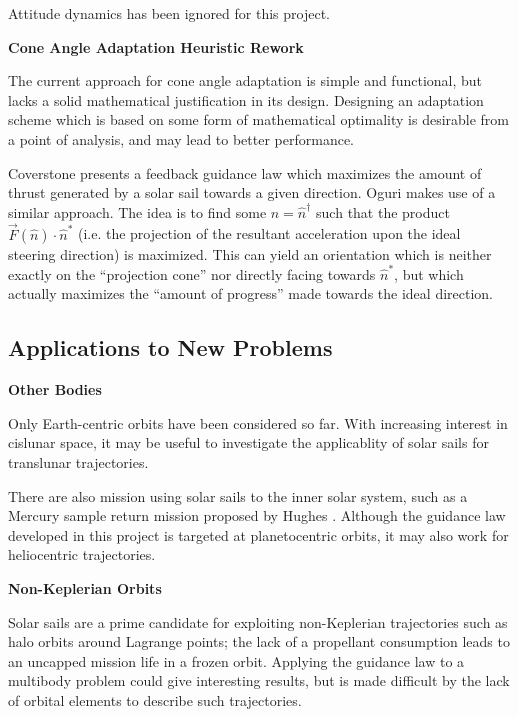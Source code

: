 Attitude dynamics has been ignored for this project.

\textbf{Cone Angle Adaptation Heuristic Rework}

The current approach for cone angle adaptation is simple and functional, but lacks a solid mathematical justification in its design. Designing an adaptation scheme which is based on some form of mathematical optimality is desirable from a point of analysis, and may lead to better performance.

Coverstone \cite{coverstone2003technique} presents a feedback guidance law which maximizes the amount of thrust generated by a solar sail towards a given direction. Oguri \cite{oguri2023solar} makes use of a similar approach. The idea is to find some \(\hat{n} = \hat{n}^\dagger\) such that the product \(\vec{F}(\hat{n}) \cdot \hat{n}^*\) (i.e. the projection of the resultant acceleration upon the ideal steering direction) is maximized. This can yield an orientation which is neither exactly on the ``projection cone'' nor directly facing towards \(\hat{n}^*\), but which actually maximizes the ``amount of progress'' made towards the ideal direction.



\subsection{Applications to New Problems}


\textbf{Other Bodies}

Only Earth-centric orbits have been considered so far. With increasing interest in cislunar space, it may be useful to investigate the applicablity of solar sails for translunar trajectories.

There are also mission using solar sails to the inner solar system, such as a Mercury sample return mission proposed by Hughes \cite{hughes2006sample}. Although the guidance law developed in this project is targeted at planetocentric orbits, it may also work for heliocentric trajectories.

\textbf{Non-Keplerian Orbits}

Solar sails are a prime candidate for exploiting non-Keplerian trajectories such as halo orbits around Lagrange points; the lack of a propellant consumption leads to an uncapped mission life in a frozen orbit. Applying the guidance law to a multibody problem could give interesting results, but is made difficult by the lack of orbital elements to describe such trajectories.

